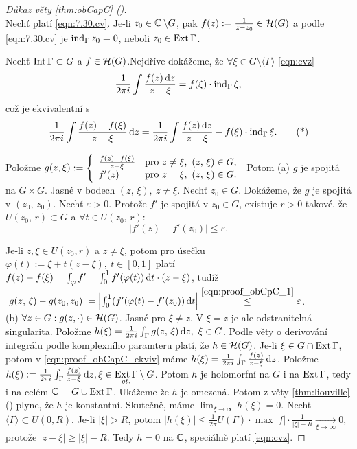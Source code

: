 \begin{proof}[Důkaz věty \cref{thm:obCapC} ()]
\mbox{}\\
     Nechť platí \cref{eqn:7.30.cv}. Je-li $z_0\in\operatorname{\mathbb{C}}\setminus G$, pak $f(z):=\frac{1}{z-z_0}\in\operatorname{\mathcal{H}} (G)$ a podle \cref{eqn:7.30.cv} je $\operatorname{ind}_\Gamma z_0=0$, neboli $z_0\in \operatorname{Ext}\Gamma$.
    
     Nechť $\operatorname{Int}\Gamma\subset G$ a $f\in \operatorname{\mathcal{H}} (G)$.\newline Nejdříve dokážeme, že $\forall\xi\in G\setminus\langle\Gamma\rangle$ \cref{eqn:cvz} $$\frac{1}{2\pi i}\int\frac{f(z) \mathop{}\!\mathrm{d} z}{z-\xi}=f(\xi)\cdot\operatorname{ind}_\Gamma \xi,$$ 
    což je ekvivalentní s 
    \begin{equation}
        \frac{1}{2\pi i}\int\frac{f(z) -f(\xi)}{z-\xi}\mathop{}\!\mathrm{d} z=\frac{1}{2\pi i}\int\frac{f(z) \mathop{}\!\mathrm{d} z}{z-\xi}-f(\xi)\cdot\operatorname{ind}_\Gamma \xi.
        \tag{*}
        \label{eqn:proof_obCapC_ekviv}
    \end{equation}
    
    Položme 
    $g(z,\xi):=\twopartdef{\frac{f(z)-f(\xi)}{z-\xi}}{z\neq\xi,\ (z,\, \xi)\in G,}{f'(z)}{z=\xi,\ (z,\, \xi)\in G.}$ Potom (a) $g$ je spojitá na $G\times G$. Jasné v bodech $(z,\, \xi),\ z\neq\xi.$ Nechť $z_0\in G$. Dokážeme, že $g$ je spojitá v $(z_0,\, z_0)$. Nechť $\varepsilon>0.$ Protože $f'$ je spojitá v $z_0\in G$, existuje $r>0$ takové, že $U(z_0,\, r)\subset G$ a $\forall t\in U(z_0,\, r):$ 
    \begin{equation}
          \left|f'(z)-f'(z_0)\right|\leq\varepsilon.
          \tag{$\times$}
          \label{eqn:proof_obCpC_1}
    \end{equation}
  
    
    Je-li $z,\xi\in U(z_0,r)$ a $z\neq\xi$, potom pro úsečku $\varphi(t):=\xi+t(z-\xi),\ t\in [0,1]$ platí $f(z)-f(\xi)=\int_\varphi f'=\int_0^1 f'(\varphi(t))\mathop{}\!\mathrm{d} t\cdot(z-\xi)$, tudíž $|g(z,\, \xi)-g(z_0,z_0)|=\left|\int_0^1(f'(\varphi(t)-f'(z_0))\diff t \right|\stackrel{\cref{eqn:proof_obCpC_1}}{\leq}\varepsilon$.\\
    
    (b) $\forall z\in G:g(z,\cdot)\in \operatorname{\mathcal{H}}(G)$. Jasné pro $\xi\neq z$. V $\xi=z$ je ale odstranitelná singularita. Položme $h(\xi)=\frac{1}{2\pi i}\int_\Gamma g(z,\, \xi)\mathop{}\!\mathrm{d} z,\ \xi \in G$. Podle věty o derivování integrálu podle komplexního paramteru platí, že $h \in\operatorname{\mathcal{H}}(G)$. Je-li $\xi\in G\cap\operatorname{Ext}\Gamma$, potom v \cref{eqn:proof_obCapC_ekviv} máme $h(\xi)=\frac{1}{2\pi i}\int_\Gamma\frac{f(z)}{z-\xi}\mathop{}\!\mathrm{d} z$. Položme $h(\xi):=\frac{1}{2\pi i}\int_\Gamma\frac{f(z)}{z-\xi}\mathop{}\!\mathrm{d} z, \xi \in \underset{ot.}{\operatorname{Ext}\Gamma}\setminus G$. Potom $h$ je holomorfní na $G$ i na $\operatorname{Ext}\Gamma$, tedy i na celém $\operatorname{\mathbb{C}}=G\cup\operatorname{Ext}\Gamma$. Ukážeme že $h$ je omezená. Potom z věty \cref{thm:liouville} () plyne, že $h$ je konstantní. Skutečně, máme $\lim_{\xi\rightarrow\infty}h(\xi)=0$. 
    Nechť $\langle\Gamma\rangle\subset U(0,R).$ Je-li $|\xi|>R$, potom $|h(\xi)|\leq\frac{1}{2\pi}U(\Gamma)\cdot\max|f|\cdot\frac{1}{|\xi|-R}\xrightarrow[\xi\rightarrow\infty]{}0$, protože $|z-\xi|\geq|\xi|-R$. Tedy $h=0$ na $\operatorname{\mathbb{C}}$, speciálně platí \cref{eqn:cvz}.
    

\end{proof}
